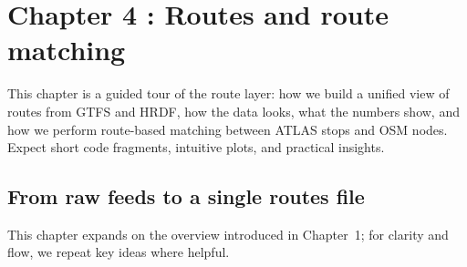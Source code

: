 \chapter{Chapter 4 : Routes and route matching}

\noindent This chapter is a guided tour of the route layer: how we build a unified view of routes from GTFS and HRDF, how the data looks, what the numbers show, and how we perform route-based matching between ATLAS stops and OSM nodes. Expect short code fragments, intuitive plots, and practical insights.

\section{From raw feeds to a single routes file}
\noindent This chapter expands on the overview introduced in Chapter~1; for clarity and flow, we repeat key ideas where helpful.
